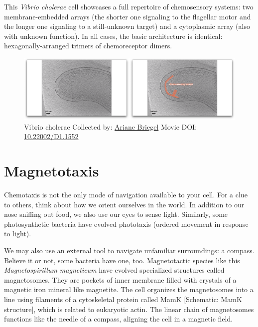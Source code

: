 \documentclass[]{tufte-book}
\begin{document}
This \emph{Vibrio cholerae} cell showcases a full repertoire of
chemosensory systems: two membrane-embedded arrays (the shorter one
signaling to the flagellar motor and the longer one signaling to a
still-unknown target) and a cytoplasmic array (also with unknown
function). In all cases, the basic architecture is identical:
hexagonally-arranged trimers of chemoreceptor dimers.





\begin{figure}
\includegraphics{movie_stills/7_5a} \caption[Vibrio cholerae Collected by:
\protect\hyperlink{ariane_briegel}{Ariane Briegel} Movie DOI:
\href{https://doi.org/10.22002/D1.1552}{10.22002/D1.1552}]{Vibrio cholerae Collected by:
\protect\hyperlink{ariane_briegel}{Ariane Briegel} Movie DOI:
\href{https://doi.org/10.22002/D1.1552}{10.22002/D1.1552}}\label{fig:7-5a}
\end{figure}

\section{Magnetotaxis}\label{magnetotaxis}

Chemotaxis is not the only mode of navigation available to your cell.
For a clue to others, think about how we orient ourselves in the world.
In addition to our nose sniffing out food, we also use our eyes to sense
light. Similarly, some photosynthetic bacteria have evolved phototaxis
(ordered movement in response to light).

We may also use an external tool to navigate unfamiliar surroundings: a
compass. Believe it or not, some bacteria have one, too. Magnetotactic
species like this \emph{Magnetospirillum magneticum} have evolved
specialized structures called magnetosomes. They are pockets of inner
membrane filled with crystals of a magnetic iron mineral like magnetite.
The cell organizes the magnetosomes into a line using filaments of a
cytoskeletal protein called MamK {[}Schematic: MamK structure{]}, which
is related to eukaryotic actin. The linear chain of magnetosomes
functions like the needle of a compass, aligning the cell in a magnetic
field.
\end{document}
